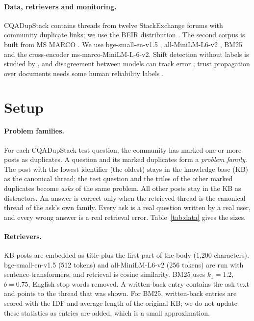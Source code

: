 \documentclass[11pt]{article}
\begin{document}
\paragraph{Data, retrievers and monitoring.} CQADupStack \citep{hoogeveen2015cqadupstack} contains threads from twelve StackExchange forums with community duplicate links; we use the BEIR distribution \citep{thakur2021beir}. The second corpus is built from MS MARCO \citep{nguyen2016msmarco}. We use bge-small-en-v1.5 \citep{xiao2024cpack}, all-MiniLM-L6-v2 \citep{reimers2019sbert,wang2020minilm}, BM25 \citep{robertson2009bm25} and the cross-encoder ms-marco-MiniLM-L-6-v2. Shift detection without labels is studied by \citet{rabanser2019failing}, and disagreement between models can track error \citep{jiang2022disagreement}; trust propagation over documents needs some human reliability labels \citep{trustproprag2026}.

\section{Setup}
\label{sec:setup}
\paragraph{Problem families.} For each CQADupStack test question, the community has marked one or more posts as duplicates. A question and its marked duplicates form a \emph{problem family}. The post with the lowest identifier (the oldest) stays in the knowledge base (KB) as the canonical thread; the test question and the titles of the other marked duplicates become \emph{asks} of the same problem. All other posts stay in the KB as distractors. An answer is correct only when the retrieved thread is the canonical thread of the ask's own family. Every ask is a real question written by a real user, and every wrong answer is a real retrieval error. Table~\ref{tab:data} gives the sizes.

\begin{table}[t]\centering\small

\caption{The twelve CQADupStack forums as used here. ``Repeat asks'' are asks of a family beyond its first ask.}
\label{tab:data}
\end{table}

\paragraph{Retrievers.} KB posts are embedded as title plus the first part of the body (1{,}200 characters). bge-small-en-v1.5 (512 tokens) and all-MiniLM-L6-v2 (256 tokens) are run with sentence-transformers, and retrieval is cosine similarity. BM25 uses $k_1=1.2$, $b=0.75$, English stop words removed. A written-back entry contains the ask text and points to the thread that was shown. For BM25, written-back entries are scored with the IDF and average length of the original KB; we do not update these statistics as entries are added, which is a small approximation.
\end{document}

